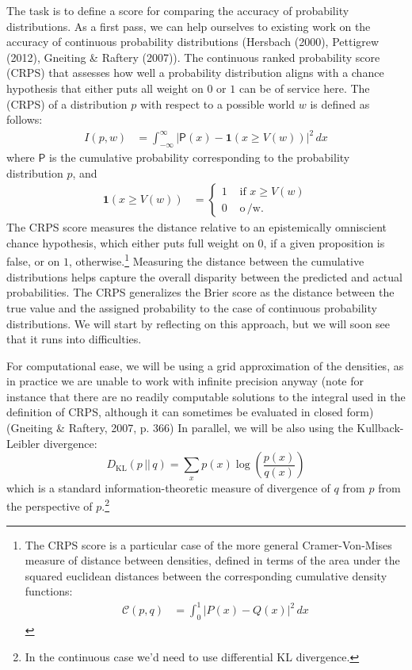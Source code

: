 \documentclass[
  letterpaper,
  DIV=11,
  numbers=noendperiod]{scrartcl}
\begin{document}
The task is to define a score for comparing the accuracy of probability
distributions. As a first pass, we can help ourselves to existing work
on the accuracy of continuous probability distributions (Hersbach
(2000), Pettigrew (2012), Gneiting \& Raftery (2007)). The continuous
ranked probability score (CRPS) that assesses how well a probability
distribution aligns with a chance hypothesis that either puts all weight
on \(0\) or \(1\) can be of service here. The (CRPS) of a distribution
\(p\) with respect to a possible world \(w\) is defined as follows:
\begin{align*}
I(p,w) &= \int_{-\infty}^\infty \vert \mathsf{P}(x) - \mathbf{ 1 }(x\geq V(w))\vert ^2 \, dx
\end{align*} \noindent where \(\mathsf{P}\) is the cumulative
probability corresponding to the probability distribution \(p\), and
\begin{align*}
\mathbf{ 1 }(x \geq V(w)) & = \begin{cases} 1 & \text{ if } x \geq V(w)\\
0 & \text{ o$\,$/w. }
\end{cases}
\end{align*} \noindent   The CRPS score measures the distance relative
to an epistemically omniscient chance hypothesis, which either puts full
weight on \(0\), if a given proposition is false, or on \(1\),
otherwise.\footnote{The CRPS score is a particular case of the more
  general Cramer-Von-Mises measure of distance between densities,
  defined in terms of the area under the squared euclidean distances
  between the corresponding cumulative density functions: \begin{align*}
  \mathcal{C}(p,q) & = \int_{0}^{1} \vert P(x) - Q(x)\vert^2 \, dx
  \end{align*}} Measuring the distance between the cumulative
distributions helps capture the overall disparity between the predicted
and actual probabilities. The CRPS generalizes the Brier score as the
distance between the true value and the assigned probability to the case
of continuous probability distributions. We will start by reflecting on
this approach, but we will soon see that it runs into difficulties.

For computational ease, we will be using a grid approximation of the
densities, as in practice we are unable to work with infinite precision
anyway (note for instance that there are no readily computable solutions
to the integral used in the definition of CRPS, although it can
sometimes be evaluated in closed form) (Gneiting \& Raftery, 2007, p.
366) In parallel, we will be also using the Kullback-Leibler divergence:
\[
D_{\text{KL}}(p \,||\, q) = \sum_{x} p(x) \log\left(\frac{p(x)}{q(x)}\right)
\] \noindent which is a standard information-theoretic measure of
divergence of \(q\) from \(p\) from the perspective of
\(p\).\footnote{In the continuous case we'd need to use differential KL divergence.}
\end{document}
